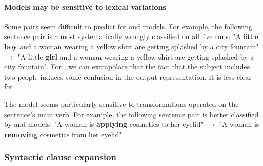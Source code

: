 \paragraph{Models may be sensitive to lexical variations}

Some pairs seem difficult to predict for \cls and \bow models. For example, the following sentence pair is almost systematically wrongly classified on all five runs: "A little \textbf{boy} and a woman wearing a yellow shirt are getting splashed by a city fountain" $\rightarrow$ "A little \textbf{girl} and a woman wearing a yellow shirt are getting splashed by a city fountain". For \bow, we can extrapolate that the fact that the subject includes two people induces some confusion in the output representation. It is less clear for \cls.

The \dep model seems particularly sensitive to transformations operated on the sentence's main verb. For example, the following sentence pair is better classified by \dep and \seq models:
"A woman is \textbf{applying} cosmetics to her eyelid" $\rightarrow$ "A woman is \textbf{removing} cosmetics from her eyelid".



\subsubsection{Syntactic clause expansion}


